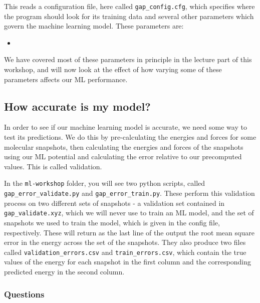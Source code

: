 \documentclass{article}
\begin{document}
This reads a configuration file, here called \verb|gap_config.cfg|, which specifies where the program should look for its training data and several other parameters which govern the machine learning model. These parameters are:
\begin{itemize}

\item 

\end{itemize}
We have covered most of these parameters in principle in the lecture part of this workshop, and will now look at the effect of how varying some of these parameters affects our ML performance.

\subsection{How accurate is my model?}

In order to see if our machine learning model is accurate, we need some way to test its predictions. We do this by pre-calculating the energies and forces for some molecular snapshots, then calculating the energies and forces of the snapshots using our ML potential and calculating the error relative to our precomputed values. This is called validation.

In the \verb|ml-workshop| folder, you will see two python scripts, called \verb|gap_error_validate.py| and \verb|gap_error_train.py|. These perform this validation process on two different sets of snapshots - a validation set contained in \verb|gap_validate.xyz|, which we will never use to train an ML model, and the set of snapshots we used to train the model, which is given in the config file, respectively. These will return as the last line of the output the root mean square error in the energy across the set of the snapshots. They also produce two files called \verb|validation_errors.csv| and \verb|train_errors.csv|, which contain the true values of the energy for each snapshot in the first column and the corresponding predicted energy in the second column.

\subsubsection*{Questions}
\end{document}
